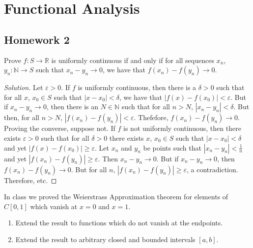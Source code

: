 \documentclass[crop=false,class=article,oneside]{standalone}
\begin{document}
    \ifx\ifmathcoursesfunctional\undefined
        \section*{Functional Analysis}
        \setcounter{section}{2}
        \renewcommand\thesubfigure{%
            \arabic{section}.\arabic{figure}.\arabic{subfigure}%
        }
    \fi
    \subsection{Homework 2}
        \begin{problem}
            Prove $f:S\rightarrow\mathbb{R}$ is uniformly
            continuous if and only if for all sequences
            $x_{n}$, $y_{n}:\mathbb{N}\rightarrow{S}$
            such that $x_{n}-y_{n}\rightarrow{0}$, we have that
            $f(x_{n})-f(y_{n})\rightarrow{0}$.
        \end{problem}
        \begin{proof}[Solution]
            Let $\varepsilon>0$. If $f$ is uniformly continuous,
            then there is a $\delta>0$ such that for all
            $x$, $x_{0}\in{S}$ such that $|x-x_{0}|<\delta$,
            we have that $|f(x)-f(x_{0})|<\varepsilon$. But if
            $x_{n}-y_{n}\rightarrow{0}$, then there is an
            $N\in\mathbb{N}$ such that for all $n>N$,
            $|x_{n}-y_{n}|<\delta$. But then, for all $n>N$,
            $|f(x_{n})-f(y_{n})|<\varepsilon$. Thefefore,
            $f(x_{n})-f(y_{n})\rightarrow{0}$. Proving the
            converse, suppose not. If $f$ is not uniformly
            continuous, then there exists $\varepsilon>0$
            such that for all $\delta>0$ there exists
            $x$, $x_{0}\in{S}$ such that
            $|x-x_{0}|<\delta$ and yet
            $|f(x)-f(x_{0})|\geq{\varepsilon}$. Let
            $x_{n}$ and $y_{n}$ be points such that
            $|x_{n}-y_{n}|<\frac{1}{n}$ and yet
            $|f(x_{n})-f(y_{n})|\geq\varepsilon$. Then
            $x_{n}-y_{n}\rightarrow{0}$. But if
            $x_{n}-y_{n}\rightarrow{0}$, then
            $f(x_{n})-f(y_{n})\rightarrow{0}$. But for all
            $n$, $|f(x_{n})-f(y_{n})|\geq{\varepsilon}$,
            a contradiction. Therefore, etc.
        \end{proof}
        \begin{problem}
            In class we proved the Weierstrass Approximation
            theorem for elements of $C[0,1]$ which vanish
            at $x=0$ and $x=1$.
            \begin{enumerate}
                \item Extend the result to functions which
                      do not vanish at the endpoints.
                \item Extend the result to arbitrary
                      closed and bounded intervals $[a,b]$.
            \end{enumerate}
        \end{problem}
\end{document}
